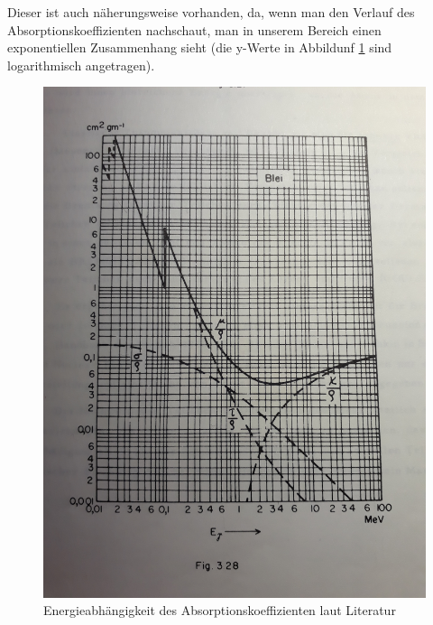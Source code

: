 Dieser ist auch näherungsweise vorhanden, da, wenn man den Verlauf des Absorptionskoeffizienten nachschaut, man in unserem Bereich einen 
exponentiellen Zusammenhang sieht (die y-Werte in Abbildunf \ref{AbsLit} sind logarithmisch angetragen).


\begin{figure}
    \captionsetup{justification=centering,margin=2cm}
    \centering
    \includegraphics[width = 12cm, angle = -90]{Bilder/Auswertung/AbsMamier.jpg}
    \caption{Energieabhängigkeit des Absorptionskoeffizienten laut Literatur \cite[S.46a]{Mamier1986}}
    \label{AbsLit}
    
\end{figure}
